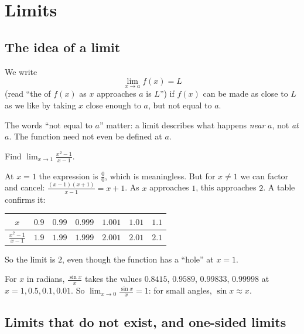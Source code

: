 \section{Limits}\label{sec:limits}

\subsection{The idea of a limit}

\begin{definition}\label{def:limit}
We write
\[
  \lim_{x \to a} f(x) = L
\]
(read ``the  of $f(x)$ as $x$ approaches $a$ is $L$'') if $f(x)$
can be made as close to $L$ as we like by taking $x$ close enough to $a$, but
not equal to $a$.
\end{definition}

The words ``not equal to $a$'' matter: a limit describes what happens
\emph{near} $a$, not \emph{at} $a$. The function need not even be defined at
$a$.

\begin{example}\label{ex:limit-hole}
Find $\lim_{x\to1} \frac{x^2 - 1}{x - 1}$.

\sol At $x = 1$ the expression is $\frac00$, which is meaningless. But for
$x \neq 1$ we can factor and cancel: $\frac{(x - 1)(x + 1)}{x - 1} = x + 1$.
As $x$ approaches $1$, this approaches $2$. A table confirms it:
\begin{center}
\begin{tabular}{c|cccccc}
$x$ & $0.9$ & $0.99$ & $0.999$ & $1.001$ & $1.01$ & $1.1$\\
\hline
$\frac{x^2-1}{x-1}$ & $1.9$ & $1.99$ & $1.999$ & $2.001$ & $2.01$ & $2.1$
\end{tabular}
\end{center}
So the limit is $2$, even though the function has a ``hole'' at $x = 1$.
\end{example}

\begin{example}\label{ex:sinx-over-x}
For $x$ in radians, $\frac{\sin x}{x}$ takes the values $0.8415$, $0.9589$,
$0.99833$, $0.99998$ at $x = 1, 0.5, 0.1, 0.01$. So
$\lim_{x\to0}\frac{\sin x}{x} = 1$: for small angles, $\sin x \approx x$.
\end{example}

\subsection{Limits that do not exist, and one-sided limits}

